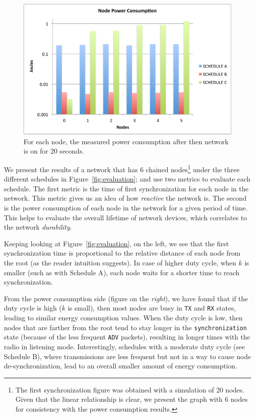 \begin{figure}[t]
\centering
\includegraphics[width=0.9\columnwidth]{figures/power_cons_big}
\caption{For each node, the measured power consumption after then network is on for 20 seconds.}
\label{fig:power_evaluation}
\end{figure}

We present the results of a network that has 6 chained nodes\footnote{The first synchronization figure was obtained with a simulation of 20 nodes. Given that the linear relationship is clear, we present the graph with 6 nodes for consistency with the power consumption results.} under the three different schedules in Figure~\ref{fig:evaluation}; and use two metrics to evaluate each schedule. The first metric is the time of first synchronization for each node in the network. This metric gives us an idea of how \emph{reactive} the network is. The second is the power consumption of each node in the network for a given period of time. This helps to evaluate the overall lifetime of network devices, which correlates to the network {\em durability}.

Keeping looking at Figure~\ref{fig:evaluation}, on the left, we see that the first synchronization time is proportional to the relative distance of each node from the root (as the reader intuition suggests). In case of higher duty cycle, when $k$ is smaller (such as with Schedule A), each node waits for a shorter time to reach synchronization. 

From the power consumption side (figure on the {\em right}), we have found that if the duty cycle is high ($k$ is small), then most nodes are busy in \texttt{TX} and \texttt{RX} states, leading to similar energy consumption values. When the duty cycle is low, then nodes that are farther from the root tend to stay longer in the \texttt{synchronization} state (because of the less frequent \texttt{ADV} packets), resulting in longer times with the radio in listening mode. Interestingly, schedules with a moderate duty cycle (see Schedule B), where transmissions are less frequent but not in a way to cause node de-synchronization, lead to an overall smaller amount of energy consumption. 

